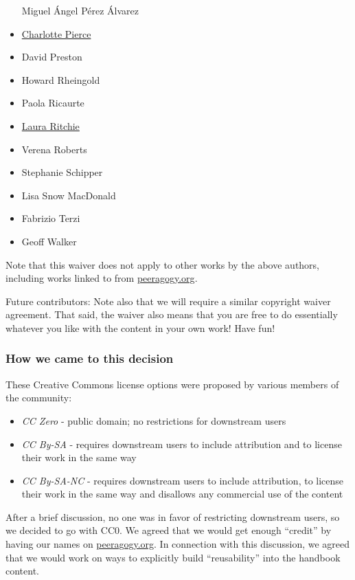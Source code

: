 \begin{itemize}
  Miguel Ángel Pérez Álvarez
\item
  \href{http://piercepress.com}{Charlotte Pierce}
\item
  David Preston
\item
  Howard Rheingold
\item
  Paola Ricaurte
\item
  \href{http://www.lauraritchie.com/}{Laura Ritchie}
\item
  Verena Roberts
\item
  Stephanie Schipper
\item
  Lisa Snow MacDonald
\item
  Fabrizio Terzi
\item
  Geoff Walker
\end{itemize}

Note that this waiver does not apply to other works by the above
authors, including works linked to from
\href{http://peeragogy.org}{peeragogy.org}.

Future contributors: Note also that we will require a similar copyright
waiver agreement. That said, the waiver also means that you are free to
do essentially whatever you like with the content in your own work! Have
fun!

\subsubsection{How we came to this
decision}\label{how-we-came-to-this-decision}

These Creative Commons license options were proposed by various members
of the community:

\begin{itemize}
\itemsep1pt\parskip0pt
\item
  \emph{CC Zero} - public domain; no restrictions for downstream users
\item
  \emph{CC By-SA} - requires downstream users to include attribution and
  to license their work in the same way
\item
  \emph{CC By-SA-NC} - requires downstream users to include attribution,
  to license their work in the same way and disallows any commercial use
  of the content
\end{itemize}

After a brief discussion, no one was in favor of restricting downstream
users, so we decided to go with CC0. We agreed that we would get enough
``credit'' by having our names on
\href{http://peeragogy.org/}{peeragogy.org}. In connection with this
discussion, we agreed that we would work on ways to explicitly build
``reusability'' into the handbook content.
